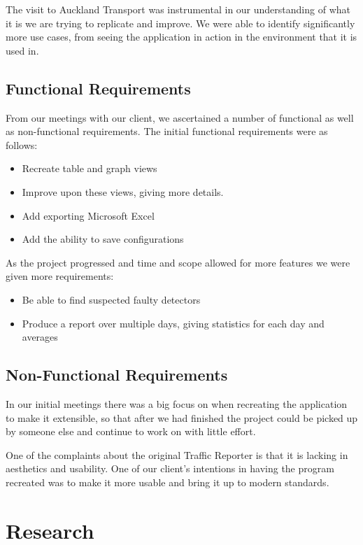 \documentclass{article}
\begin{document}
The visit to Auckland Transport was instrumental in our
understanding of what it is we are trying to replicate and
improve. We were able to identify significantly more use
cases, from seeing the application in action in the environment
that it is used in.

\subsection{Functional Requirements}
From our meetings with our client, we ascertained a number of functional as well as non-functional requirements. The initial functional requirements were as follows:

\begin{itemize}
	\item Recreate table and graph views
	\item Improve upon these views, giving more details.
	\item Add exporting Microsoft Excel
	\item Add the ability to save configurations
\end{itemize}

As the project progressed and time and scope allowed for more features we were given more requirements:

\begin{itemize}
	\item Be able to find suspected faulty detectors
	\item Produce a report over multiple days, giving statistics for each day and averages
\end{itemize}

\subsection{Non-Functional Requirements}

In our initial meetings there was a big focus on when recreating the application to make it extensible, so that after we had finished the project could be picked up by someone else and continue to work on with little effort.

One of the complaints about the original Traffic Reporter is that it is lacking in aesthetics and usability. One of our client's intentions in having the program recreated was to make it more usable and bring it up to modern standards.

\section{Research}
\end{document}
